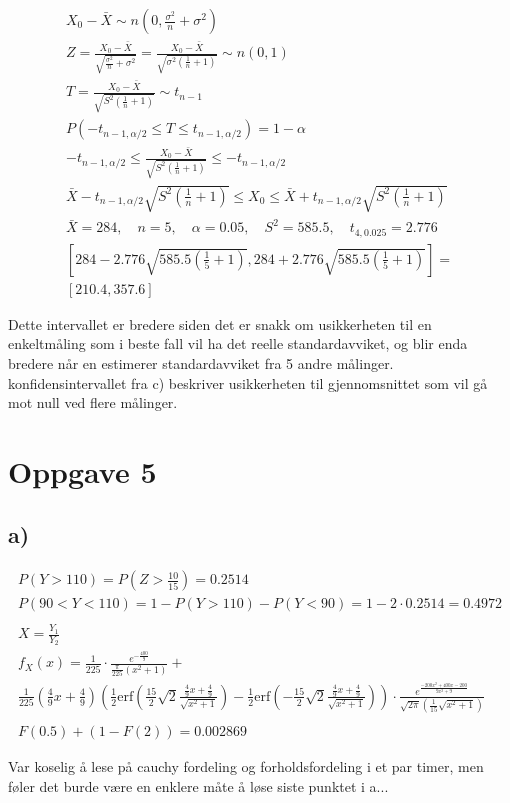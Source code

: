 \begin{gather*}
	X_0 - \bar X \sim n(0, \frac{\sigma^2}{n} + \sigma^2)
	\\
	Z = \frac{X_0 - \bar X}{\sqrt{\frac{\sigma^2}{n} + \sigma^2}} = \frac{X_0 - \bar X}{\sqrt{\sigma^2 \left(\frac{1}{n} + 1\right)}} \sim n(0, 1)
	\\
	T = \frac{X_0 - \bar X}{\sqrt{S^2 \left(\frac{1}{n} + 1\right)}} \sim t_{n - 1}
	\\
	P\left(-t_{n - 1, \alpha / 2} \leq T \leq t_{n - 1, \alpha / 2}\right) = 1 - \alpha
	\\
	-t_{n - 1, \alpha / 2} \leq \frac{X_0 - \bar X}{\sqrt{S^2 \left(\frac{1}{n} + 1\right)}} \leq -t_{n - 1, \alpha / 2}
	\\
	\bar X - t_{n - 1, \alpha / 2} \sqrt{S^2 \left(\frac{1}{n} + 1\right)} \leq X_0 \leq \bar X + t_{n - 1, \alpha / 2} \sqrt{S^2 \left(\frac{1}{n} + 1\right)}
	\\
	\bar X = 284, \quad n = 5, \quad \alpha = 0.05, \quad S^2 = 585.5, \quad t_{4, 0.025} = 2.776
	\\
	\left[284 - 2.776 \sqrt{585.5\left(\frac{1}{5} + 1\right)}, 284 + 2.776 \sqrt{585.5\left(\frac{1}{5} + 1\right)}\right] =
	\\
	\left[210.4, 357.6\right]
\end{gather*}

Dette intervallet er bredere siden det er snakk om usikkerheten til en enkeltmåling som i beste fall vil ha det reelle standardavviket, og blir enda bredere når en estimerer standardavviket fra 5 andre målinger. konfidensintervallet fra c) beskriver usikkerheten til gjennomsnittet som vil gå mot null ved flere målinger.


\section*{Oppgave 5}

\subsection*{a)}

\begin{gather*}
	P(Y > 110) = P\left(Z > \frac{10}{15}\right) = 0.2514
	\\
	P(90 < Y < 110) = 1 - P(Y > 110) - P(Y < 90) = 1 - 2 \cdot 0.2514 = 0.4972
	\\
	\\
	X = \frac{Y_1}{Y_2}
	\\
	f_X(x) =
	\frac{1}{225} \cdot \frac{e^{-\frac{400}{9}}}{\frac{\pi}{225}(x^2 + 1)}
	+
	\\
	\frac{1}{225} \left(\frac{4}{9} x + \frac{4}{9}\right) \left(
		\frac{1}{2} \text{erf}\left(\frac{15}{2} \sqrt{2} \frac{\frac{4}{9} x + \frac{4}{9}}{\sqrt{x^2 + 1}}\right)
		-
		\frac{1}{2} \text{erf}\left(-\frac{15}{2} \sqrt{2} \frac{\frac{4}{9} x + \frac{4}{9}}{\sqrt{x^2 + 1}}\right)
	\right)
	\cdot \frac{e^{\frac{-200 x^2 + 400 x - 200}{9 x^2 + 9}}}{\sqrt{2 \pi}\left(\frac{1}{15} \sqrt{x^2 + 1}\right)}
	\\
	\\
	F(0.5) + (1 - F(2)) = 0.002869
\end{gather*}

Var koselig å lese på cauchy fordeling og forholdsfordeling i et par timer, men føler det burde være en enklere måte å løse siste punktet i a...


